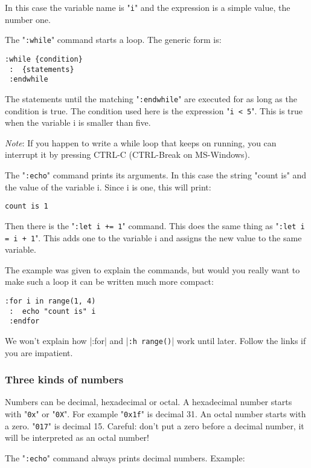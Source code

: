 In this case the variable name is "\verb!i!" and the expression is a simple value, the number one.

The "\verb!:while!" command starts a loop.
The generic form is:

\begin{Verbatim}[samepage=true]
 :while {condition}
 :  {statements}
 :endwhile
\end{Verbatim}

The statements until the matching "\verb!:endwhile!" are executed for as long as the condition is true.
The condition used here is the expression "\verb!i < 5!".
This is true when the variable i is smaller than five.

\emph{Note}: If you happen to write a while loop that keeps on running, you can interrupt it by pressing CTRL-C (CTRL-Break on MS-Windows).

The "\verb!:echo!" command prints its arguments.
In this case the string "count is" and the value of the variable i.
Since i is one, this will print:

\begin{Verbatim}[samepage=true]
    count is 1
\end{Verbatim}

Then there is the "\verb!:let i += 1!" command.
This does the same thing as "\verb!:let i = i + 1!".
This adds one to the variable i and assigns the new value to the same variable.

The example was given to explain the commands, but would you really want to make such a loop it can be written much more compact:

\begin{Verbatim}[samepage=true]
 :for i in range(1, 4)
 :  echo "count is" i
 :endfor
\end{Verbatim}

We won't explain how |:for| and |\verb!:h range()!| work until later.
Follow the links if you are impatient.

\subsubsection{Three kinds of numbers}
Numbers can be decimal, hexadecimal or octal.
A hexadecimal number starts with "\verb!0x!" or "\verb!0X!".
For example "\verb!0x1f!" is decimal 31.
An octal number starts with a zero.
"\verb!017!" is decimal 15.
Careful: don't put a zero before a decimal number, it will be interpreted as an octal number!

The "\verb!:echo!" command always prints decimal numbers.
Example:

